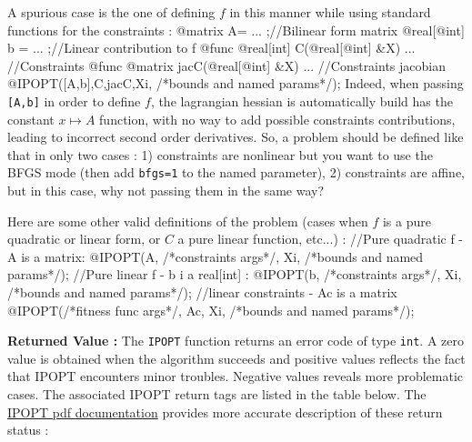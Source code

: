 \documentclass[a4paper,twoside,12pt]{book}
\begin{document}
A spurious case is the one of defining $f$ in this manner while using standard functions for the constraints :
\bFF
  @matrix A= ... ;//Bilinear form matrix
  @real[@int] b = ... ;//Linear contribution to f
  @func @real[int] C(@real[@int] &X) {...} //Constraints
  @func @matrix jacC(@real[@int] &X) {...} //Constraints jacobian
  @IPOPT([A,b],C,jacC,Xi, /*bounds and named params*/);
\eFF
Indeed, when passing {\tt [A,b]} in order to define $f$, the lagrangian hessian is automatically build has the constant $x \mapsto A$ function, with no way to add possible constraints contributions, leading to incorrect second order derivatives. So, a problem should be defined like that in only two cases : 1) constraints are nonlinear but you want to use the BFGS mode (then add {\tt bfgs=1} to the named parameter), 2) constraints are affine, but in this case, why not passing them in the same way?

Here are some other valid definitions of the problem (cases when $f$ is a pure quadratic or linear form, or $C$ a pure linear function, etc...) :
\bFF
  //Pure quadratic f - A is a matrix:
  @IPOPT(A, /*constraints args*/, Xi, /*bounds and named params*/);
  //Pure linear f - b i a real[int] :
  @IPOPT(b, /*constraints args*/, Xi, /*bounds and named params*/);
  //linear constraints - Ac is a matrix
  @IPOPT(/*fitness func args*/, Ac, Xi, /*bounds and named params*/);
\eFF

\textbf{Returned Value :} The {\tt IPOPT} function returns an error code of type {\tt int}. A zero value is obtained when the algorithm succeeds and positive values reflects the fact that IPOPT encounters minor troubles. Negative values reveals more problematic cases. The associated IPOPT return tags are listed in the table below. The \href{https://projects.coin-or.org/Ipopt/browser/stable/3.10/Ipopt/doc/documentation.pdf?format=raw}{IPOPT pdf documentation} provides more accurate description of these return status :\newline
\end{document}
